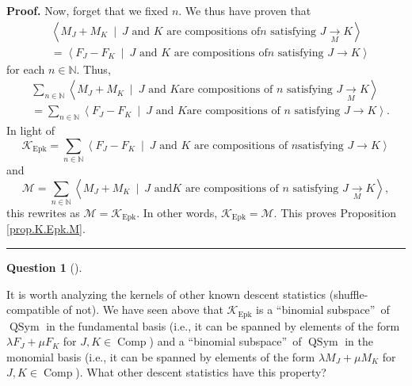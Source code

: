 \documentclass[numbers=enddot,12pt,final,onecolumn,notitlepage]{scrartcl}%
\theoremstyle{definition}
\newtheorem{quest}[theo]{Question}
\newenvironment{question}[1][]
{\begin{quest}[#1]\begin{leftbar}}
{\end{leftbar}\end{quest}}
\newenvironment{proof}[1][Proof]{\noindent\textbf{#1.} }{\ \rule{0.5em}{0.5em}}
\newenvironment{question}[1][Question]{\noindent\textbf{#1.} }{\ \rule{0.5em}{0.5em}}
\newenvironment{verlong}{}{}
\let\sumnonlimits\sum
\renewcommand{\sum}{\sumnonlimits\limits}
\begin{document}
\begin{verlong}
\begin{proof}
Now, forget that we fixed $n$. We thus have proven that
\begin{align*}
&  \left\langle M_{J}+M_{K}\ \mid\ J\text{ and }K\text{ are compositions of
}n\text{ satisfying }J\underset{M}{\rightarrow}K\right\rangle \\
&  =\left\langle F_{J}-F_{K}\ \mid\ J\text{ and }K\text{ are compositions of
}n\text{ satisfying }J\rightarrow K\right\rangle
\end{align*}
for each $n\in\mathbb{N}$. Thus,%
\begin{align*}
&  \sum_{n\in\mathbb{N}}\left\langle M_{J}+M_{K}\ \mid\ J\text{ and }K\text{
are compositions of }n\text{ satisfying }J\underset{M}{\rightarrow
}K\right\rangle \\
&  =\sum_{n\in\mathbb{N}}\left\langle F_{J}-F_{K}\ \mid\ J\text{ and }K\text{
are compositions of }n\text{ satisfying }J\rightarrow K\right\rangle .
\end{align*}
In light of%
\[
\mathcal{K}_{\operatorname*{Epk}}=\sum_{n\in\mathbb{N}}\left\langle
F_{J}-F_{K}\ \mid\ J\text{ and }K\text{ are compositions of }n\text{
satisfying }J\rightarrow K\right\rangle
\]
and%
\[
\mathcal{M}=\sum_{n\in\mathbb{N}}\left\langle M_{J}+M_{K}\ \mid\ J\text{ and
}K\text{ are compositions of }n\text{ satisfying }J\underset{M}{\rightarrow
}K\right\rangle ,
\]
this rewrites as $\mathcal{M}=\mathcal{K}_{\operatorname*{Epk}}$. In other
words, $\mathcal{K}_{\operatorname*{Epk}}=\mathcal{M}$. This proves
Proposition \ref{prop.K.Epk.M}.
\end{proof}
\end{verlong}

\begin{question}
It is worth analyzing the kernels of other known descent statistics
(shuffle-compatible of not). We have seen above that $\mathcal{K}%
_{\operatorname*{Epk}}$ is a \textquotedblleft binomial
subspace\textquotedblright\ of $\operatorname*{QSym}$ in the fundamental basis
(i.e., it can be spanned by elements of the form $\lambda F_{J}+\mu F_{K}$ for
$J,K\in\operatorname*{Comp}$) and a \textquotedblleft binomial
subspace\textquotedblright\ of $\operatorname*{QSym}$ in the monomial basis
(i.e., it can be spanned by elements of the form $\lambda M_{J}+\mu M_{K}$ for
$J,K\in\operatorname*{Comp}$). What other descent statistics have this property?
\end{question}
\end{document}
